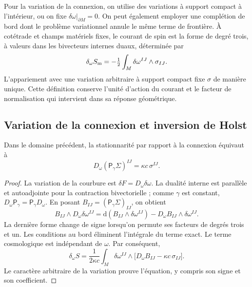 Pour la variation de la connexion, on utilise des variations à support compact à l'intérieur, ou on fixe \(\delta\omega|_{\partial M}=0\). On peut également employer une complétion de bord dont le problème variationnel annule le même terme de frontière. À cotétrade et champs matériels fixes, le courant de spin est la forme de degré trois, à valeurs dans les bivecteurs internes duaux, déterminée par
\begin{equation}
 \delta_\omega S_{\rm m}
 =-\tfrac12\int_M\delta\omega^{IJ}\wedge\sigma_{IJ}.
 \label{vii:eq:corriente-variacional}
\end{equation}
L'appariement avec une variation arbitraire à support compact fixe
\(\sigma\) de manière unique. Cette définition conserve l'unité
d'action du courant et le facteur de normalisation qui intervient dans
sa réponse géométrique.

\subsection{Variation de la connexion et inversion de Holst}
\label{vii:subsec:variacion-holst}

\begin{theorem}
\label{vii:thm:ecuacion-cartan-holst}
Dans le domaine précédent, la stationnarité par rapport à la connexion
équivaut à
\begin{equation}
 D_\omega(\mathsf P_\gamma\Sigma)^{IJ}
       =\kappa c\,\sigma^{IJ}.
 \label{vii:eq:ecuacion-cartan-holst}
\end{equation}
\end{theorem}
\begin{proof}
La variation de la courbure est
\(\delta F=D_\omega\delta\omega\). La dualité interne est parallèle
et autoadjointe pour la contraction bivectorielle ; comme \(\gamma\) est
constant, \(D_\omega\mathsf P_\gamma=\mathsf P_\gamma D_\omega\).
En posant \(B_{IJ}=(\mathsf P_\gamma\Sigma)_{IJ}\), on obtient
\[
 B_{IJ}\wedge D_\omega\delta\omega^{IJ}
 =\mathrm d(B_{IJ}\wedge\delta\omega^{IJ})
   -D_\omega B_{IJ}\wedge\delta\omega^{IJ}.
\]
La dernière forme change de signe lorsqu'on permute ses facteurs de degrés trois
et un. Les conditions au bord éliminent l'intégrale du terme
exact. Le terme cosmologique est indépendant de \(\omega\).
Par conséquent,
\[
 \delta_\omega S=
 \frac1{2\kappa c}\int_M\delta\omega^{IJ}\wedge
       \bigl[D_\omega B_{IJ}-\kappa c\,\sigma_{IJ}\bigr].
\]
Le caractère arbitraire de la variation prouve l'équation, y compris son signe et son coefficient.
\end{proof}

